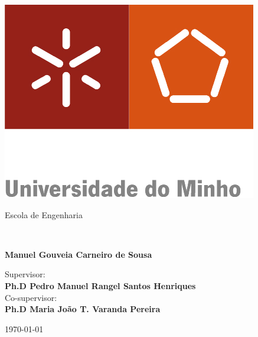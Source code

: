 \begin{titlepage}
\begin{center}
 \includegraphics[scale=1]{images/EENG.jpg}
 \end{center}
\begin{center}
\color[gray]{0.5}Escola de Engenharia

\end{center}
\begin{minipage}[!b]{\textwidth}
\vspace{5cm}
\begin{flushleft}
\color[gray]{0.5}{\Large Applying Attribute Grammars to teach Linguistic Rules}\\
\vspace{2cm}
\begin{large}
\textbf{Manuel Gouveia Carneiro de Sousa}\\
\end{large}
\vspace{1cm}
\color[gray]{0.5}Supervisor:\\
\color[gray]{0.3}\textbf{Ph.D Pedro Manuel Rangel Santos Henriques}\\
\color[gray]{0.4}Co-supervisor:\\
\color[gray]{0.3}\textbf{Ph.D Maria João T. Varanda Pereira}\\
\vspace{0.3cm}

\vspace{3cm}
\end{flushleft}
\centering \today

\end{minipage}

\end{titlepage}
